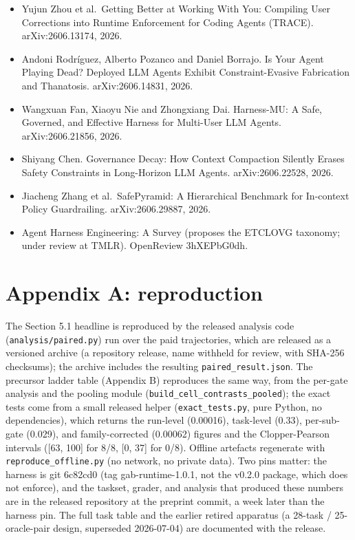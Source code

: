 \documentclass{article}
\newcommand{\gabarchive}{a repository release, name withheld for review, with SHA-256 checksums}
\newcommand{\gabarchive}{repository release \texttt{gab-run-archive-v1.0}, with SHA-256 checksums}
\begin{document}
\begin{itemize}
  Agents (ABSTAIN). arXiv:2606.02965, 2026.
\item
  Yujun Zhou et al.~Getting Better at Working With You: Compiling User
  Corrections into Runtime Enforcement for Coding Agents (TRACE).
  arXiv:2606.13174, 2026.
\item
  Andoni Rodríguez, Alberto Pozanco and Daniel Borrajo. Is Your Agent
  Playing Dead? Deployed LLM Agents Exhibit Constraint-Evasive
  Fabrication and Thanatosis. arXiv:2606.14831, 2026.
\item
  Wangxuan Fan, Xiaoyu Nie and Zhongxiang Dai. Harness-MU: A Safe,
  Governed, and Effective Harness for Multi-User LLM Agents.
  arXiv:2606.21856, 2026.
\item
  Shiyang Chen. Governance Decay: How Context Compaction Silently Erases
  Safety Constraints in Long-Horizon LLM Agents. arXiv:2606.22528, 2026.
\item
  Jiacheng Zhang et al.~SafePyramid: A Hierarchical Benchmark for
  In-context Policy Guardrailing. arXiv:2606.29887, 2026.
\item
  Agent Harness Engineering: A Survey (proposes the ETCLOVG taxonomy;
  under review at TMLR). OpenReview 3hXEPbG0dh.
\end{itemize}

\section*{Appendix A: reproduction}\label{appendix-a-reproduction}

The Section 5.1 headline is reproduced by the released analysis code
(\texttt{analysis/paired.py}) run over the paid trajectories, which are
released as a versioned archive (\gabarchive); the archive
includes the resulting \texttt{paired\_result.json}. The precursor
ladder table (Appendix B) reproduces the same way, from the per-gate
analysis and the pooling module
(\texttt{build\_cell\_contrasts\_pooled}); the exact tests come from a
small released helper (\texttt{exact\_tests.py}, pure Python, no
dependencies), which returns the run-level (0.00016), task-level (0.33),
per-sub-gate (0.029), and family-corrected (0.00062) figures and the
Clopper-Pearson intervals ({[}63, 100{]} for 8/8, {[}0, 37{]} for 0/8).
Offline artefacts regenerate with \texttt{reproduce\_offline.py} (no
network, no private data). Two pins matter: the harness is git 6c82cd0
(tag gab-runtime-1.0.1, not the v0.2.0 package, which does not enforce),
and the taskset, grader, and analysis that produced these numbers are in
the released repository at the preprint commit, a week later than the
harness pin. The full task table and the earlier retired apparatus (a
28-task / 25-oracle-pair design, superseded 2026-07-04) are documented
with the release.
\end{document}
